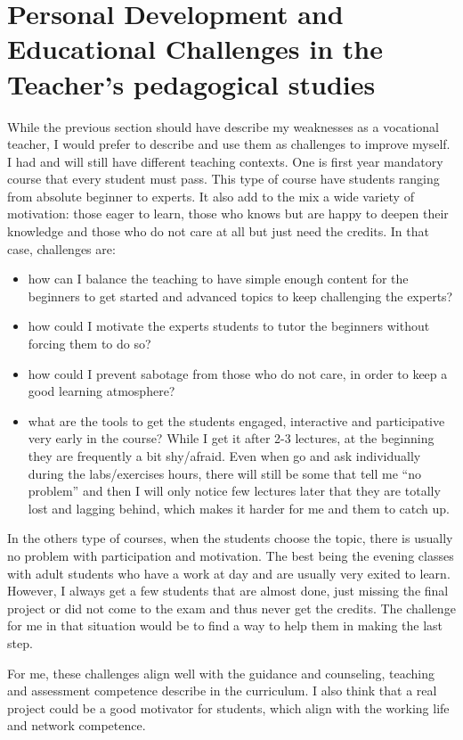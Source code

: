 \section{Personal Development and Educational Challenges in the Teacher's pedagogical studies}

While the previous section should have describe my weaknesses as a vocational teacher, I would prefer to describe and use them as challenges to improve myself.
I had and will still have different teaching contexts. 
One is first year mandatory course that every student must pass.
This type of course have students ranging from absolute beginner to experts.
It also add to the mix a wide variety of motivation: those eager to learn, those who knows but are happy to deepen their knowledge and those who do not care at all but just need the credits.
In that case, challenges are:
\begin{itemize}
\item how can I balance the teaching to have simple enough content for the beginners to get started and advanced topics to keep challenging the experts?
\item how could I motivate the experts students to tutor the beginners without forcing them to do so?
\item how could I prevent sabotage from those who do not care, in order to keep a good learning atmosphere?
\item what are the tools to get the students engaged, interactive and participative very early in the course?
While I get it after 2-3 lectures, at the beginning they are frequently a bit shy/afraid. 
Even when go and ask individually during the labs/exercises hours, there will still be some that tell me ``no problem'' and then I will only notice few lectures later that they are totally lost and lagging behind, which makes it harder for me and them to catch up. 
\end{itemize}
  
In the others type of courses, when the students choose the topic, there is usually no problem with participation and motivation. 
The best being the evening classes with adult students who have a work at day and are usually very exited to learn. 
However, I always get a few students that are almost done, just missing the final project or did not come to the exam and thus never get the credits. 
The challenge for me in that situation would be to find a way to help them in making the last step.

For me, these challenges align well with the guidance and counseling, teaching and assessment competence describe in the curriculum. 
I also think that a real project could be a good motivator for students, which align with the working life and network competence. 
  
